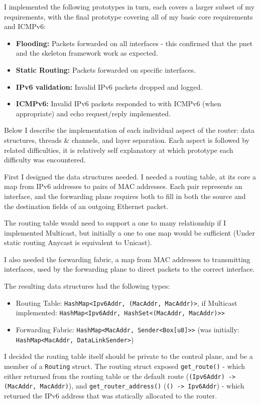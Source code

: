 \documentclass[12pt,a4paper,twoside,openany]{report}
\begin{document}
\bigskip

I implemented the following prototypes in turn, each covers a larger subset of my requirements, with the final prototype covering all of my basic core requirements and ICMPv6:
\begin{itemize}
\item \textbf{Flooding:} Packets forwarded on all interfaces - this confirmed that the pnet and the skeleton framework work as expected.
\item \textbf{Static Routing:} Packets forwarded on specific interfaces.
\item \textbf{IPv6 validation:} Invalid IPv6 packets dropped and logged.
\item \textbf{ICMPv6:} Invalid IPv6 packets responded to with ICMPv6 (when appropriate) and echo request/reply implemented.
\end{itemize}
Below I describe the implementation of each individual aspect of the router: data structures, threads \& channels, and layer separation.  Each aspect is followed by related difficulties, it is relatively self explanatory at which prototype each difficulty was encountered.

\bigskip

First I designed the data structures needed.  I needed a routing table, at its core a map from IPv6 addresses to pairs of MAC addresses. Each pair represents an interface, and the forwarding plane requires both to fill in both the source and the destination fields of an outgoing Ethernet packet.  

The routing table would need to support a one to many relationship if I implemented Multicast, but initially a one to one map would be sufficient (Under static routing Anycast is equivalent to Unicast).  

I also needed the forwarding fabric, a map from MAC addresses to transmitting interfaces, used by the forwarding plane to direct packets to the correct interface.

The resulting data structures had the following types:
\begin{itemize}
\item Routing Table: \verb!HashMap<Ipv6Addr, (MacAddr, MacAddr)>!, if Multicast implemented: \verb!HashMap<Ipv6Addr, HashSet<(MacAddr, MacAddr)>>!
\item Forwarding Fabric: \verb!HashMap<MacAddr, Sender<Box[u8]>>! (was initially: \verb!HashMap<MacAddr, DataLinkSender>!)
\end{itemize}
I decided the routing table itself should be private to the control plane, and be a member of a \verb!Routing! struct.  The routing struct exposed \verb!get_route()! - which either returned from the routing table or the default route (\verb!(Ipv6Addr) -> (MacAddr, MacAddr)!), and \verb!get_router_address()! (\verb!() -> Ipv6Addr!) - which returned the IPv6 address that was statically allocated to the router. 
\end{document}
